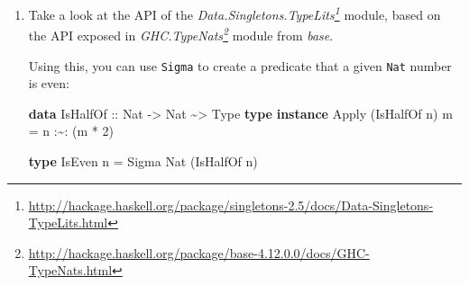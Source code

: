 \documentclass[]{article}
\newenvironment{Shaded}{}{}
\newcommand{\DataTypeTok}[1]{\textcolor[rgb]{0.56,0.13,0.00}{#1}}
\newcommand{\DecValTok}[1]{\textcolor[rgb]{0.25,0.63,0.44}{#1}}
\newcommand{\KeywordTok}[1]{\textcolor[rgb]{0.00,0.44,0.13}{\textbf{#1}}}
\newcommand{\NormalTok}[1]{#1}
\newcommand{\OperatorTok}[1]{\textcolor[rgb]{0.40,0.40,0.40}{#1}}
\newcommand{\OtherTok}[1]{\textcolor[rgb]{0.00,0.44,0.13}{#1}}
\renewcommand{\href}[2]{#2\footnote{\url{#1}}}
\begin{document}
\begin{enumerate}
  will contain a \texttt{Door} that must be knockable.

  Try doing it for both (a) the ``dependent proof'' version (with the
  \texttt{Knockable} data type) and for (b) the type family version (with the
  \texttt{StatePass} type family).

  \href{https://github.com/mstksg/inCode/tree/master/code-samples/singletons/Door4Final.hs\#L192-L192}{Solutions
  here!} I gave four different ways of doing it, for a full range of manual
  vs.~auto-promoted defunctionalization symbols and \texttt{Knockable}
  vs.~\texttt{Pass}-based methods.

  \emph{Hint:} Look at the definition of \texttt{SomeDoor} in terms of
  \texttt{Sigma}:

\begin{Shaded}
\begin{Highlighting}[]
\KeywordTok{type} \DataTypeTok{SomeDoor} \OtherTok{=} \DataTypeTok{Sigma} \DataTypeTok{DoorState}\NormalTok{ (}\DataTypeTok{TyCon1} \DataTypeTok{Door}\NormalTok{)}
\end{Highlighting}
\end{Shaded}

  \emph{Hint}: Try having \texttt{KnockableDoor} return a tuple.
\item
  Take a look at the API of the
  \emph{\href{http://hackage.haskell.org/package/singletons-2.5/docs/Data-Singletons-TypeLits.html}{Data.Singletons.TypeLits}}
  module, based on the API exposed in
  \emph{\href{http://hackage.haskell.org/package/base-4.12.0.0/docs/GHC-TypeNats.html}{GHC.TypeNats}}
  module from \emph{base}.

  Using this, you can use \texttt{Sigma} to create a predicate that a given
  \texttt{Nat} number is even:

\begin{Shaded}
\begin{Highlighting}[]
\KeywordTok{data} \DataTypeTok{IsHalfOf}\OtherTok{ ::} \DataTypeTok{Nat} \OtherTok{{-}\textgreater{}} \DataTypeTok{Nat} \OperatorTok{\textasciitilde{}\textgreater{}} \DataTypeTok{Type}
\KeywordTok{type} \KeywordTok{instance} \DataTypeTok{Apply}\NormalTok{ (}\DataTypeTok{IsHalfOf}\NormalTok{ n) m }\OtherTok{=}\NormalTok{ n }\OperatorTok{:\textasciitilde{}:}\NormalTok{ (m }\OperatorTok{*} \DecValTok{2}\NormalTok{)}

\KeywordTok{type} \DataTypeTok{IsEven}\NormalTok{ n }\OtherTok{=} \DataTypeTok{Sigma} \DataTypeTok{Nat}\NormalTok{ (}\DataTypeTok{IsHalfOf}\NormalTok{ n)}
\end{Highlighting}
\end{Shaded}


\end{enumerate}
\end{document}
